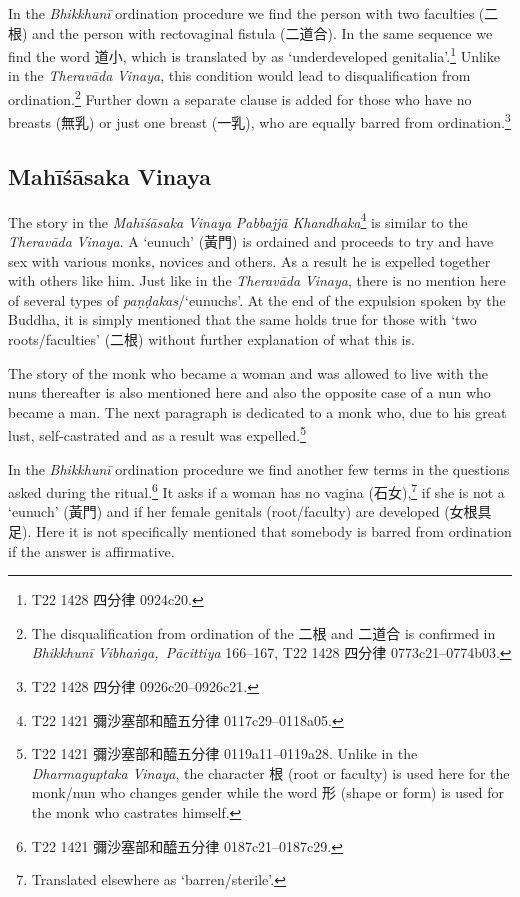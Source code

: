 In the {\em Bhikkhunī} ordination procedure we find the person with two faculties (二根) and the person with rectovaginal fistula (二道合). In the same sequence we find the word 道小, which is translated by \cite{bodhi} as `underdeveloped genitalia'.\footnote{T22 1428 四分律 0924c20.} Unlike in the {\em Theravāda} {\em Vinaya}, this condition would lead to disqualification from ordination.\footnote{The disqualification from ordination of the 二根 and 二道合 is confirmed in {\em Bhikkhunī Vibhaṅga, Pācittiya} 166–167, T22 1428 四分律 0773c21–0774b03.} Further down a separate clause is added for those who have no breasts (無乳) or just one breast (一乳), who are equally barred from ordination.\footnote{T22 1428 四分律 0926c20–0926c21.}

\subsection{Mahīśāsaka Vinaya}
The story in the {\em Mahīśāsaka} {\em Vinaya} {\em Pabbajjā Khandhaka}\footnote{T22 1421 彌沙塞部和醯五分律 0117c29–0118a05.} is similar to the {\em Theravāda} {\em Vinaya}. A `eunuch' (黃門) is ordained and proceeds to try and have sex with various monks, novices and others. As a result he is expelled together with others like him. Just like in the {\em Theravāda} {\em Vinaya}, there is no mention here of several types of {\em paṇḍakas}/`eunuchs'. At the end of the expulsion spoken by the Buddha, it is simply mentioned that the same holds true for those with `two roots/faculties' (二根) without further explanation of what this is.

The story of the monk who became a woman and was allowed to live with the nuns thereafter is also mentioned here and also the opposite case of a nun who became a man. The next paragraph is dedicated to a monk who, due to his great lust, self-castrated and as a result was expelled.\footnote{T22 1421 彌沙塞部和醯五分律 0119a11–0119a28. Unlike in the {\em Dharmaguptaka} {\em Vinaya}, the character 根 (root or faculty) is used here for the monk/nun who changes gender while the word 形 (shape or form) is used for the monk who castrates himself.} 

In the {\em Bhikkhunī} ordination procedure we find another few terms in the questions asked during the ritual.\footnote{T22 1421 彌沙塞部和醯五分律 0187c21–0187c29.} It asks if a woman has no vagina (石女),\footnote{Translated elsewhere as `barren/sterile'.} if she is not a `eunuch' (黃門) and if her female genitals (root/faculty) are developed (女根具足). Here it is not specifically mentioned that somebody is barred from ordination if the answer is affirmative.

